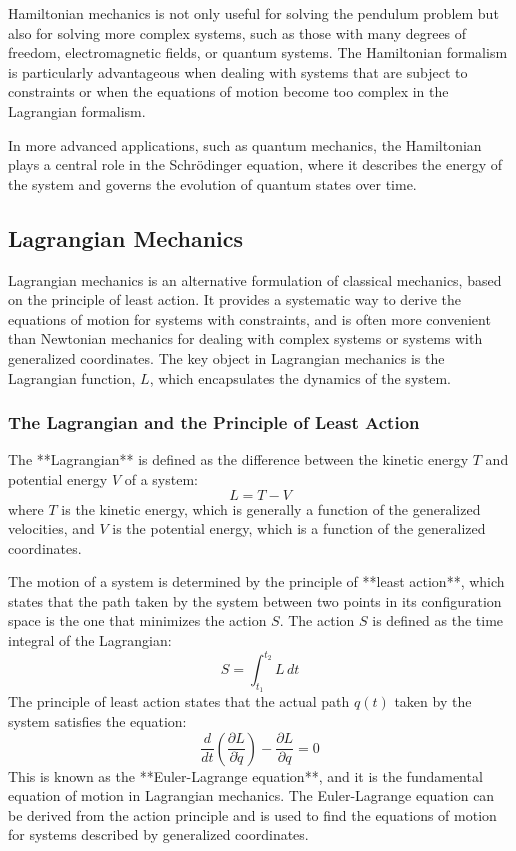 \documentclass{article}
\begin{document}
Hamiltonian mechanics is not only useful for solving the pendulum problem but also for solving more complex systems, such as those with many degrees of freedom, electromagnetic fields, or quantum systems. The Hamiltonian formalism is particularly advantageous when dealing with systems that are subject to constraints or when the equations of motion become too complex in the Lagrangian formalism.

In more advanced applications, such as quantum mechanics, the Hamiltonian plays a central role in the Schrödinger equation, where it describes the energy of the system and governs the evolution of quantum states over time.

\subsection{Lagrangian Mechanics}

Lagrangian mechanics is an alternative formulation of classical mechanics, based on the principle of least action. It provides a systematic way to derive the equations of motion for systems with constraints, and is often more convenient than Newtonian mechanics for dealing with complex systems or systems with generalized coordinates. The key object in Lagrangian mechanics is the Lagrangian function, \( L \), which encapsulates the dynamics of the system.

\subsubsection*{The Lagrangian and the Principle of Least Action}

The **Lagrangian** is defined as the difference between the kinetic energy \( T \) and potential energy \( V \) of a system:
\[
L = T - V
\]
where \( T \) is the kinetic energy, which is generally a function of the generalized velocities, and \( V \) is the potential energy, which is a function of the generalized coordinates.

The motion of a system is determined by the principle of **least action**, which states that the path taken by the system between two points in its configuration space is the one that minimizes the action \( S \). The action \( S \) is defined as the time integral of the Lagrangian:
\[
S = \int_{t_1}^{t_2} L \, dt
\]
The principle of least action states that the actual path \( q(t) \) taken by the system satisfies the equation:
\[
\frac{d}{dt} \left( \frac{\partial L}{\partial \dot{q}} \right) - \frac{\partial L}{\partial q} = 0
\]
This is known as the **Euler-Lagrange equation**, and it is the fundamental equation of motion in Lagrangian mechanics. The Euler-Lagrange equation can be derived from the action principle and is used to find the equations of motion for systems described by generalized coordinates.
\end{document}
